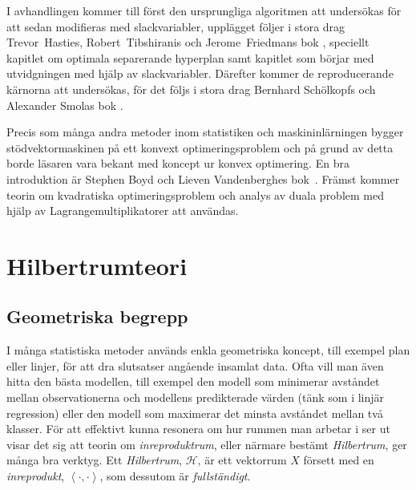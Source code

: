 \documentclass[a4paper, 12pt]{report}
\theoremstyle{definition}
\theoremstyle{remark}
\newcommand{\llangle}{\left\langle}
\newcommand{\rrangle}{\right\rangle}
\begin{document}
I avhandlingen kommer till först den ursprungliga algoritmen att under\-sökas för att sedan modifieras med slackvariabler, upplägget följer i stora drag \mbox{Trevor Hasties}, \mbox{Robert Tibshiranis} och \mbox{Jerome Friedmans} bok \cite{ESL}, speciellt kapitlet om optimala separerande hyperplan samt kapitlet som börjar med utvidgningen med hjälp av slackvariabler.
Därefter kommer de reproducerande kärnorna att undersökas, för det följs i stora drag Bernhard Schölkopfs och Alexander Smolas bok \cite{LearningKernels}.

Precis som många andra metoder inom statistiken och maskininlärningen bygger stödvektormaskinen på ett konvext optimeringsproblem och på grund av detta borde läsaren vara bekant med koncept ur konvex optimering.
En bra introduktion är Stephen Boyd och Lieven Vandenberghes bok~\cite{Boyd}.
Främst kommer teorin om kvadratiska optimeringsproblem och analys av duala problem med hjälp av Lagrangemultiplikatorer att användas.


\chapter{Hilbertrumteori}\label{chap:hilbert}

\section{Geometriska begrepp}
I många statistiska metoder används enkla geometriska koncept, till exempel plan eller linjer, för att dra slutsatser angående insamlat data.
Ofta vill man även hitta den bästa modellen, till exempel den modell som minimerar avståndet mellan observationerna och modellens predikterade värden (tänk som i linjär regression) eller den modell som maximerar det minsta avståndet mellan två klasser.
För att effektivt kunna resonera om hur rummen man arbetar i ser ut visar det sig att teorin om \emph{inreproduktrum}, eller närmare bestämt \emph{Hilbertrum}, ger många bra verktyg.
Ett \emph{Hilbertrum}, $\mathcal{H}$, är ett vektorrum $X$ försett med en \emph{inreprodukt}, $\llangle \cdot, \cdot\rrangle$, som dessutom är \emph{fullständigt}.
\end{document}
